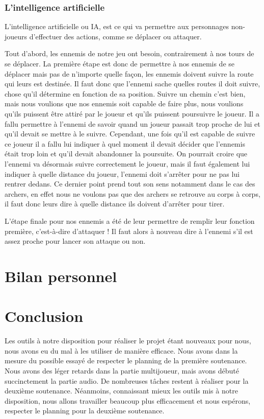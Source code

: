 \documentclass[a4paper, 12pt]{article}
\begin{document}
		\subsubsection{L'intelligence artificielle}
		L’intelligence artificielle ou IA, est ce qui va permettre aux personnages non-joueurs d’effectuer des actions, comme se déplacer ou attaquer. 
\par Tout d’abord, les ennemis de notre jeu ont besoin, contrairement à nos tours de se déplacer. La première étape est donc de permettre à nos ennemis de se déplacer mais pas de n’importe quelle façon, les ennemis doivent suivre la route qui leurs est destinée. Il faut donc que l’ennemi sache quelles routes il doit suivre, chose qu’il détermine en fonction de sa position. Suivre un chemin c’est bien, mais nous voulions que nos ennemis soit capable de faire plus, nous voulions qu’ils puissent être attiré par le joueur et qu’ils puissent poursuivre le joueur. Il a fallu permettre à l’ennemi de savoir quand un joueur passait trop proche de lui et qu’il devait se mettre à le suivre. Cependant, une fois qu’il est capable de suivre ce joueur il a fallu lui indiquer à quel moment il devait décider que l’ennemis était trop loin et qu’il devait abandonner la poursuite. On pourrait croire que l’ennemi va désormais suivre correctement le joueur, mais il faut également lui indiquer à quelle distance du joueur, l’ennemi doit s’arrêter pour ne pas lui rentrer dedans. Ce dernier point prend tout son sens notamment dans le cas des archers, en effet nous ne voulons pas que des archers se retrouve au corps à corps, il faut donc leurs dire à quelle distance ils doivent d’arrêter pour tirer.
\par L’étape finale pour nos ennemis a été de leur permettre de remplir leur fonction première, c’est-à-dire d’attaquer ! Il faut alors à nouveau dire à l’ennemi s’il est assez proche pour lancer son attaque ou non.

\section{Bilan personnel}

\section{Conclusion}

Les outils à notre disposition pour réaliser le projet étant  nouveaux pour nous, nous avons eu du mal à les utiliser de manière efficace. Nous avons dans la mesure du possible essayé de respecter le planning de la première soutenance. Nous avons des l\'eger retards dans la partie multijoueur, mais avons d\'ebut\'e succinctement la partie audio. De nombreuses tâches restent à réaliser pour la deuxième soutenance. Néanmoins, connaissant mieux les outils mis à notre disposition, nous allons travailler beaucoup plus efficacement et nous espérons, respecter le planning pour la deuxième soutenance. 
\end{document}
